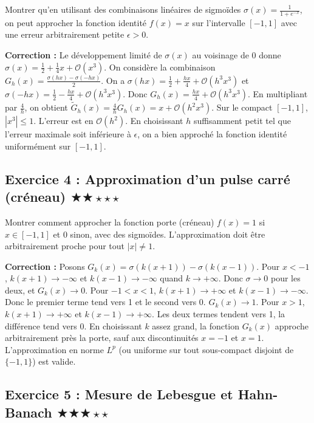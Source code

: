 \documentclass[11pt,a4paper]{article}
\begin{document}
Montrer qu'en utilisant des combinaisons linéaires de sigmoïdes $\sigma(x) = \frac{1}{1+e^{-x}}$, on peut approcher la fonction identité $f(x) = x$ sur l'intervalle $[-1, 1]$ avec une erreur arbitrairement petite $\epsilon > 0$.

\textbf{Correction :}
Le développement limité de $\sigma(x)$ au voisinage de 0 donne $\sigma(x) = \frac{1}{2} + \frac{1}{4}x + \mathcal{O}(x^3)$.
On considère la combinaison $G_h(x) = \frac{\sigma(h x) - \sigma(-h x)}{2}$.
On a $\sigma(hx) = \frac{1}{2} + \frac{h x}{4} + \mathcal{O}(h^3 x^3)$ et $\sigma(-hx) = \frac{1}{2} - \frac{h x}{4} + \mathcal{O}(h^3 x^3)$.
Donc $G_h(x) = \frac{h x}{4} + \mathcal{O}(h^3 x^3)$.
En multipliant par $\frac{4}{h}$, on obtient $\tilde{G}_h(x) = \frac{4}{h} G_h(x) = x + \mathcal{O}(h^2 x^3)$.
Sur le compact $[-1, 1]$, $|x^3| \le 1$. L'erreur est en $\mathcal{O}(h^2)$.
En choisissant $h$ suffisamment petit tel que l'erreur maximale soit inférieure à $\epsilon$, on a bien approché la fonction identité uniformément sur $[-1, 1]$.


\vspace{1cm}
\subsection*{Exercice 4 : Approximation d'un pulse carré (créneau) \quad $\bigstar\bigstar\star\star\star$}

Montrer comment approcher la fonction porte (créneau) $f(x) = 1$ si $x \in [-1, 1]$ et $0$ sinon, avec des sigmoïdes. L'approximation doit être arbitrairement proche pour tout $|x| \neq 1$.

\textbf{Correction :}
Posons $G_k(x) = \sigma(k(x+1)) - \sigma(k(x-1))$.
Pour $x < -1$, $k(x+1) \to -\infty$ et $k(x-1) \to -\infty$ quand $k \to +\infty$. Donc $\sigma \to 0$ pour les deux, et $G_k(x) \to 0$.
Pour $-1 < x < 1$, $k(x+1) \to +\infty$ et $k(x-1) \to -\infty$. Donc le premier terme tend vers 1 et le second vers 0. $G_k(x) \to 1$.
Pour $x > 1$, $k(x+1) \to +\infty$ et $k(x-1) \to +\infty$. Les deux termes tendent vers 1, la différence tend vers 0.
En choisissant $k$ assez grand, la fonction $G_k(x)$ approche arbitrairement près la porte, sauf aux discontinuités $x = -1$ et $x = 1$. L'approximation en norme $L^p$ (ou uniforme sur tout sous-compact disjoint de $\{-1, 1\}$) est valide.


\vspace{1cm}
\subsection*{Exercice 5 : Mesure de Lebesgue et Hahn-Banach \quad $\bigstar\bigstar\bigstar\star\star$}
\end{document}
